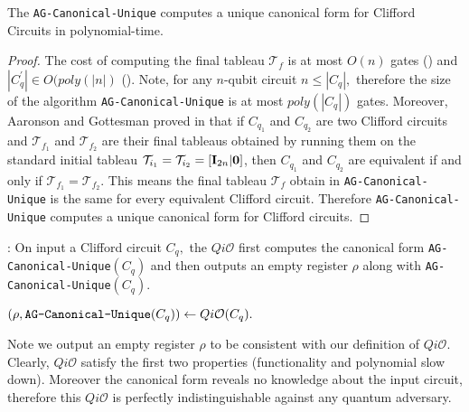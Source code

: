 \begin{lemma}
The {\tt AG-Canonical-Unique} computes a unique canonical form for Clifford Circuits in polynomial-time.
\end{lemma}

\begin{proof}
The cost of computing the final tableau $\mathcal{T}_f$ is at most $O(n)$ gates (\cite{AG04}) and $|C_q^\prime |\in O(poly(|n|)$ (\cite{AG04}).  Note, for any $n$-qubit circuit $n\leq |C_q|,$ therefore the size of the algorithm {\tt AG-Canonical-Unique} is at most $poly(|C_q|)$ gates. Moreover, Aaronson and Gottesman proved in \cite{AG04} that if $C_{q_1}$ and $C_{q_2}$ are two Clifford circuits and $\mathcal{T}_{f_1}$ and $\mathcal{T}_{f_2}$ are their final tableaus obtained by running them on the standard initial tableau
$\mathcal{T}_{i_1}=\mathcal{T}_{i_2}=[{\bf I}_{2n}|{\bf 0}]$, then $C_{q_1}$ and $C_{q_2}$ are equivalent if and only if $\mathcal{T}_{f_1}=\mathcal{T}_{f_2}.$ This means the final tableau $\mathcal{T}_f$ obtain in {\tt AG-Canonical-Unique} is the same for every equivalent Clifford circuit. Therefore {\tt AG-Canonical-Unique} computes a unique canonical form for Clifford circuits.
\end{proof}

:  On input a Clifford circuit $C_q,$ the $Qi\mathcal{O}$ first computes the canonical form  {\tt AG-Canonical-Unique}$(C_q)$ and then outputs an empty register $\rho$ along with {\tt AG-Canonical-Unique}$(C_q).$

\begin{center}
$(\rho, \mbox{{\tt AG-Canonical-Unique}}(C_q))\leftarrow Qi\mathcal{O}(C_q).$
\end{center}
Note we output an empty register $\rho$ to be consistent with our definition of  $Qi\mathcal{O}.$ Clearly, $Qi\mathcal{O}$ satisfy the first two properties (functionality and polynomial slow down). Moreover the canonical form reveals no knowledge about the input circuit, therefore this $Qi\mathcal{O}$ is perfectly indistinguishable against any quantum adversary.






